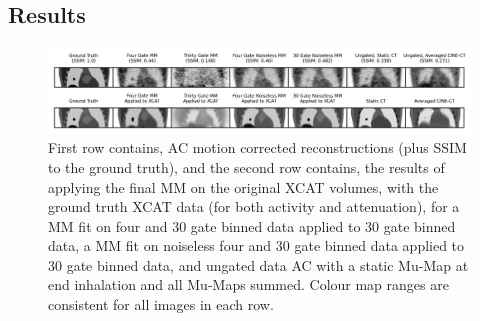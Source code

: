         \subsection{Results} \label{sec:pet_ct_motion_correction_exploiting_motion_models_fit_on_coarsely_gated_data_applied_to_finely_gated_data_results}
            \begin{figure}
                \centering
                
                \includegraphics[width=1.0\linewidth]{figures/motion_correction_2_results_1_visual_analysis.png}
                
                \captionsetup{singlelinecheck=false}
                \caption{
                    First row contains, \gls{AC} motion corrected reconstructions (plus \gls{SSIM} to the ground truth), and the second row contains, the results of applying the final \gls{MM} on the original \gls{XCAT} volumes, with the ground truth \gls{XCAT} data (for both activity and attenuation), for a \gls{MM} fit on four and $30$ gate binned data applied to $30$ gate binned data, a \gls{MM} fit on noiseless four and $30$ gate binned data applied to $30$ gate binned data, and ungated data \gls{AC} with a static \gls{Mu-Map} at end inhalation and all \glspl{Mu-Map} summed. Colour map ranges are consistent for all images in each row.
                }
                
                \label{fig:pet_ct_motion_correction_exploiting_motion_models_fit_on_coarsely_gated_data_applied_to_finely_gated_data_results_visual_analysis}
            \end{figure}
            
